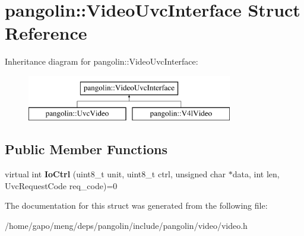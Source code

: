 \hypertarget{structpangolin_1_1_video_uvc_interface}{}\section{pangolin\+:\+:Video\+Uvc\+Interface Struct Reference}
\label{structpangolin_1_1_video_uvc_interface}
Inheritance diagram for pangolin\+:\+:Video\+Uvc\+Interface\+:\begin{figure}[H]
\begin{center}
\leavevmode
\includegraphics[height=2.000000cm]{structpangolin_1_1_video_uvc_interface}
\end{center}
\end{figure}
\subsection*{Public Member Functions}
\begin{DoxyCompactItemize}
\item 
virtual int {\bfseries Io\+Ctrl} (uint8\+\_\+t unit, uint8\+\_\+t ctrl, unsigned char $\ast$data, int len, Uvc\+Request\+Code req\+\_\+code)=0\hypertarget{structpangolin_1_1_video_uvc_interface_a4ece8356e62298691a6a46ae446ed191}{}\label{structpangolin_1_1_video_uvc_interface_a4ece8356e62298691a6a46ae446ed191}

\end{DoxyCompactItemize}


The documentation for this struct was generated from the following file\+:\begin{DoxyCompactItemize}
\item 
/home/gapo/meng/deps/pangolin/include/pangolin/video/video.\+h\end{DoxyCompactItemize}
